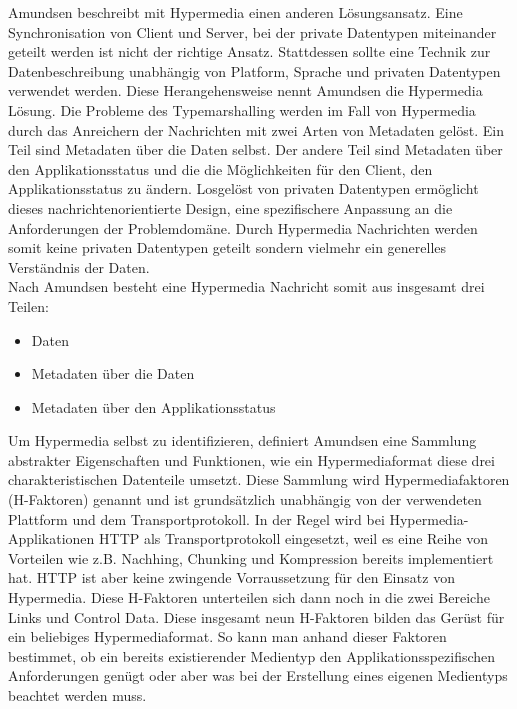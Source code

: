 Amundsen beschreibt mit Hypermedia einen anderen Lösungsansatz. Eine Synchronisation von Client und Server, bei der private Datentypen miteinander geteilt werden ist nicht der richtige Ansatz. Stattdessen sollte eine Technik zur Datenbeschreibung unabhängig von Platform, Sprache und privaten Datentypen verwendet werden. Diese Herangehensweise nennt Amundsen die Hypermedia Lösung. Die Probleme des Typemarshalling werden im Fall von Hypermedia durch das Anreichern der Nachrichten mit zwei Arten von Metadaten gelöst. Ein Teil sind Metadaten über die Daten selbst. Der andere Teil sind Metadaten über den Applikationsstatus und die die Möglichkeiten für den Client, den Applikationsstatus zu ändern. Losgelöst von privaten Datentypen ermöglicht dieses nachrichtenorientierte Design, eine spezifischere Anpassung an die Anforderungen der Problemdomäne. Durch Hypermedia Nachrichten werden somit keine privaten Datentypen geteilt sondern vielmehr ein generelles Verständnis der Daten.\\
Nach Amundsen besteht eine Hypermedia Nachricht somit aus insgesamt drei Teilen:
\begin{itemize}
\item Daten
\item Metadaten über die Daten
\item Metadaten über den Applikationsstatus
\end{itemize}
Um Hypermedia selbst zu identifizieren, definiert Amundsen eine Sammlung abstrakter Eigenschaften und Funktionen, wie ein Hypermediaformat diese drei charakteristischen Datenteile umsetzt. Diese Sammlung wird Hypermediafaktoren (H-Faktoren) genannt und ist grundsätzlich unabhängig von der verwendeten Plattform und dem Transportprotokoll. In der Regel wird bei Hypermedia-Applikationen HTTP als Transportprotokoll eingesetzt, weil es eine Reihe von Vorteilen wie z.B. Nachhing, Chunking und Kompression bereits implementiert hat. HTTP ist aber keine zwingende Vorraussetzung für den Einsatz von Hypermedia. Diese H-Faktoren unterteilen sich dann noch in die zwei Bereiche Links und Control Data. Diese insgesamt neun H-Faktoren bilden das Gerüst für ein beliebiges Hypermediaformat. So kann man anhand dieser Faktoren bestimmet, ob ein bereits existierender Medientyp den Applikationsspezifischen Anforderungen genügt oder aber was bei der Erstellung eines eigenen Medientyps beachtet werden muss.\\






